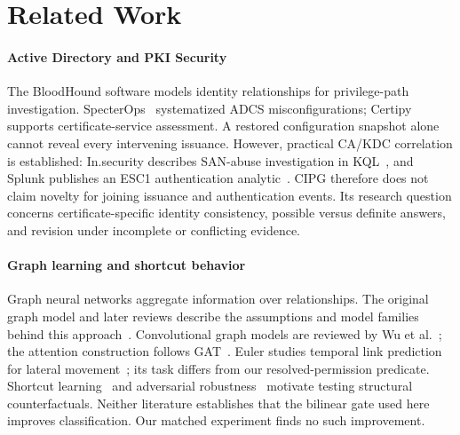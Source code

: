 \section{Related Work}
\label{sec:related_conclusion}


\paragraph{Active Directory and PKI Security}
The BloodHound software models identity relationships for privilege-path investigation. SpecterOps~\cite{schroeder2021certified} systematized ADCS misconfigurations; Certipy~\cite{lyak2021certipy} supports certificate-service assessment. A restored configuration snapshot alone cannot reveal every intervening issuance. However, practical CA/KDC correlation is established: In.security describes SAN-abuse investigation in KQL~\cite{insecurity2023adcs}, and Splunk publishes an ESC1 authentication analytic~\cite{splunk2026esc1}. CIPG therefore does not claim novelty for joining issuance and authentication events. Its research question concerns certificate-specific identity consistency, possible versus definite answers, and revision under incomplete or conflicting evidence.

\paragraph{Graph learning and shortcut behavior}
Graph neural networks aggregate information over relationships. The original graph model and later reviews describe the assumptions and model families behind this approach~\cite{scarselli2008graph,wu2021survey,zhou2020review}. Convolutional graph models are reviewed by Wu et al.~\cite{wu2021survey}; the attention construction follows GAT~\cite{velickovic2018graph}. Euler studies temporal link prediction for lateral movement~\cite{king2023euler}; its task differs from our resolved-permission predicate. Shortcut learning~\cite{geirhos2020shortcut} and adversarial robustness~\cite{wu2025understanding} motivate testing structural counterfactuals. Neither literature establishes that the bilinear gate used here improves classification. Our matched experiment finds no such improvement.

